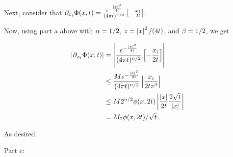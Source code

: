 \documentclass[a4paper,12pt]{article}
\begin{document}
Next, consider that $\partial_{x_i} \Phi(x,t) = \frac{e^{-\frac{\left\lvert x \right\rvert^2}{4t}}}{(4 \pi t)^{n/2}}\left[-\frac{x_i}{2t}\right]$. %

Now, using part a above with $\alpha = 1/2$, $z = \left\lvert x \right\rvert^2/(4t)$, and $\beta = 1/2$, we get

\begin{align*}
\left\lvert \partial_{x_i} \Phi(x,t) \right\rvert &= \left\lvert \frac{e^{-\frac{\left\lvert x \right\rvert^2}{4t}}}{(4 \pi t)^{n/2}}\left[-\frac{x_i}{2t}\right] \right\rvert\\
&\leq \frac{Me^{-\frac{\left\lvert x \right\rvert^2}{8t}}}{(4 \pi t)^{n/2}}\left\lvert \frac{x_i}{2tz^\beta} \right\rvert\\
&\leq M 2^{n/2}\phi(x,2t)\left\lvert \frac{\left\lvert x \right\rvert}{2t} \frac{2\sqrt{t}}{\left\lvert x \right\rvert} \right\rvert\\
&= M_2\phi(x,2t)/\sqrt{t}\\
\end{align*}

As desired.

\shunt

Part c:

\shunt
\end{document}
